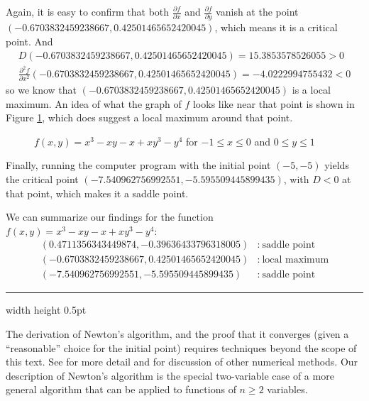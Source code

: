 \begin{exmp}
Again, it is easy to confirm that both $\frac{\partial f}{\partial x}$ and $\frac{\partial f}{\partial y}$ vanish
at the point\\$(-0.6703832459238667,0.42501465652420045)$, which means it is a critical point. And
\begin{gather*}
 D(-0.6703832459238667,0.42501465652420045) = 15.3853578526055 > 0\\
 \frac{\partial^2 f}{\partial x^2}(-0.6703832459238667,0.42501465652420045) = -4.0222994755432 < 0
\end{gather*}
so we know that $(-0.6703832459238667,0.42501465652420045)$ is a local maximum. An idea of what the graph of $f$ looks
like near that point is shown in Figure \ref{fig:newtonmax}, which does suggest a local maximum around that point.

\begin{figure}[h]
 \begin{center}
  
 \end{center}\vspace{-9mm}
 \caption[]{\quad $f(x,y) = x^3 - xy - x + xy^3 - y^4$ for $-1 \le x \le 0$ and $0 \le y \le 1$}
 \label{fig:newtonmax}
\end{figure}

Finally, running the computer program with the initial point $(-5,-5)$ yields the critical point
$(-7.540962756992551,-5.595509445899435)$, with $D < 0$ at that point, which makes it a saddle point.

We can summarize our findings for the function $f(x,y) = x^3 - xy - x + xy^3 - y^4$:
\begin{align*}
 (0.4711356343449874,-0.39636433796318005)&:~ \text{saddle point}\\
 (-0.6703832459238667,0.42501465652420045)&:~ \text{local maximum}\\
 (-7.540962756992551,-5.595509445899435)&:~ \text{saddle point}
\end{align*}
\end{exmp}
\hrule width \textwidth height 0.5pt
\vspace{3mm}

The derivation of Newton's algorithm, and the proof that it converges (given a ``reasonable'' choice for the
initial point) requires techniques beyond the scope of this text. See \cite{rr} for more
detail and for discussion of other numerical methods. Our description of Newton's algorithm is the special
two-variable case of a more general algorithm that can be applied to functions of $n \ge 2$ variables.

